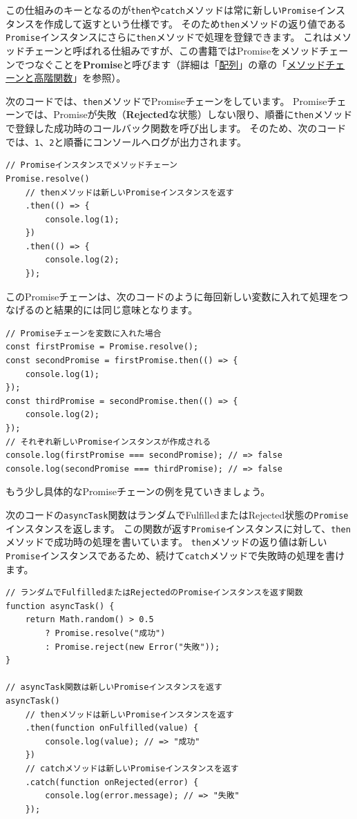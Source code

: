 この仕組みのキーとなるのが\texttt{then}や\texttt{catch}メソッドは常に新しい\texttt{Promise}インスタンスを作成して返すという仕様です。
そのため\texttt{then}メソッドの返り値である\texttt{Promise}インスタンスにさらに\texttt{then}メソッドで処理を登録できます。
これはメソッドチェーンと呼ばれる仕組みですが、この書籍ではPromiseをメソッドチェーンでつなぐことを\textbf{Promise}と呼びます（詳細は「\hyperlink{array}{配列}」の章の「\hyperlink{method-chain-and-high-order-function}{メソッドチェーンと高階関数}」を参照）。

次のコードでは、\texttt{then}メソッドでPromiseチェーンをしています。
Promiseチェーンでは、Promiseが失敗（\textbf{Rejected}な状態）しない限り、順番に\texttt{then}メソッドで登録した成功時のコールバック関数を呼び出します。
そのため、次のコードでは、\texttt{1}、\texttt{2}と順番にコンソールへログが出力されます。

\begin{lstlisting}
// Promiseインスタンスでメソッドチェーン
Promise.resolve()
    // thenメソッドは新しいPromiseインスタンスを返す
    .then(() => {
        console.log(1);
    })
    .then(() => {
        console.log(2);
    });
\end{lstlisting}

このPromiseチェーンは、次のコードのように毎回新しい変数に入れて処理をつなげるのと結果的には同じ意味となります。

\begin{lstlisting}
// Promiseチェーンを変数に入れた場合
const firstPromise = Promise.resolve();
const secondPromise = firstPromise.then(() => {
    console.log(1);
});
const thirdPromise = secondPromise.then(() => {
    console.log(2);
});
// それぞれ新しいPromiseインスタンスが作成される
console.log(firstPromise === secondPromise); // => false
console.log(secondPromise === thirdPromise); // => false
\end{lstlisting}

もう少し具体的なPromiseチェーンの例を見ていきましょう。

次のコードの\texttt{asyncTask}関数はランダムでFulfilledまたはRejected状態の\texttt{Promise}インスタンスを返します。
この関数が返す\texttt{Promise}インスタンスに対して、\texttt{then}メソッドで成功時の処理を書いています。
\texttt{then}メソッドの返り値は新しい\texttt{Promise}インスタンスであるため、続けて\texttt{catch}メソッドで失敗時の処理を書けます。

\begin{lstlisting}
// ランダムでFulfilledまたはRejectedのPromiseインスタンスを返す関数
function asyncTask() {
    return Math.random() > 0.5 
        ? Promise.resolve("成功")
        : Promise.reject(new Error("失敗"));
}

// asyncTask関数は新しいPromiseインスタンスを返す
asyncTask()
    // thenメソッドは新しいPromiseインスタンスを返す
    .then(function onFulfilled(value) {　
        console.log(value); // => "成功"
    })
    // catchメソッドは新しいPromiseインスタンスを返す
    .catch(function onRejected(error) {
        console.log(error.message); // => "失敗"
    });
\end{lstlisting}

